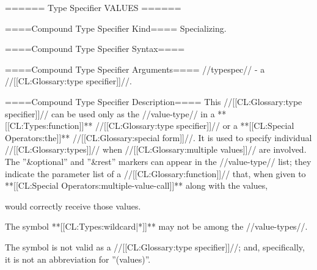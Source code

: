 ====== Type Specifier VALUES ======

====Compound Type Specifier Kind====
Specializing.

====Compound Type Specifier Syntax====



====Compound Type Specifier Arguments====
//typespec// - a //[[CL:Glossary:type specifier]]//.

====Compound Type Specifier Description====
This //[[CL:Glossary:type specifier]]// can be used only as the //value-type// in a **[[CL:Types:function]]** //[[CL:Glossary:type specifier]]// or a **[[CL:Special Operators:the]]** //[[CL:Glossary:special form]]//. It is used to specify individual //[[CL:Glossary:types]]// when //[[CL:Glossary:multiple values]]// are involved. The ''&optional'' and ''&rest'' markers can appear in the //value-type// list; they indicate the parameter list of a //[[CL:Glossary:function]]// that, when given to **[[CL:Special Operators:multiple-value-call]]** along with the values,

would correctly receive those values.

The symbol **[[CL:Types:wildcard|*]]** may not be among the //value-types//.

The symbol  is not valid as a //[[CL:Glossary:type specifier]]//; and, specifically, it is not an abbreviation for ''(values)''.

